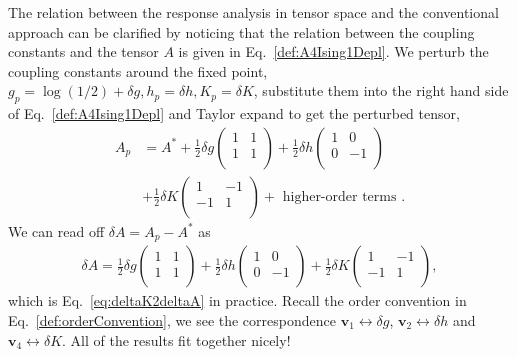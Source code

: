 \documentclass[aps,prb,reprint,superscriptaddress]{revtex4-2}
\begin{document}
The relation between the response analysis in tensor space and the
conventional approach can be clarified by noticing that the relation between
the coupling constants and the tensor $A$ is given in
Eq.~\eqref{def:A4Ising1Depl}. We perturb the coupling constants around
the fixed point, $g_p = \log{(1/2)} + \delta g, h_p = \delta h, K_p =
\delta K$, substitute them into the right hand side of
Eq.~\eqref{def:A4Ising1Depl} and Taylor expand to get the perturbed
tensor,
%
\begin{align}\label{eq:Apert4Ising1D}
    A_p &= A^* + \frac{1}{2} \delta g
    \begin{pmatrix}
    1 & 1 \\
    1 & 1 \\
    \end{pmatrix}
    + \frac{1}{2} \delta h
    \begin{pmatrix}
    1 & 0 \\
    0 & -1 \\
    \end{pmatrix} \nonumber\\
    &+ \frac{1}{2} \delta K
    \begin{pmatrix}
    1 & -1 \\
    -1 & 1 \\
    \end{pmatrix}
    + \text{ higher-order terms }.
\end{align}
%
We can read off $\delta A = A_p - A^*$ as
%
\begin{align}\label{eq:deltaA4Ising1D}
    \delta A = \frac{1}{2} \delta g
    \begin{pmatrix}
    1 & 1 \\
    1 & 1 \\
    \end{pmatrix}
    + \frac{1}{2} \delta h
    \begin{pmatrix}
    1 & 0 \\
    0 & -1 \\
    \end{pmatrix} 
    + \frac{1}{2} \delta K
    \begin{pmatrix}
    1 & -1 \\
    -1 & 1 \\
    \end{pmatrix},
\end{align}
%
which is Eq.~\eqref{eq:deltaK2deltaA} in practice. Recall the order
convention in Eq.~\eqref{def:orderConvention}, we see the correspondence
$\mathbf{v}_1 \leftrightarrow \delta g$, $\mathbf{v}_2 \leftrightarrow
\delta h$ and $\mathbf{v}_4 \leftrightarrow \delta K$. All of the
results fit together nicely! 
%
\end{document}
